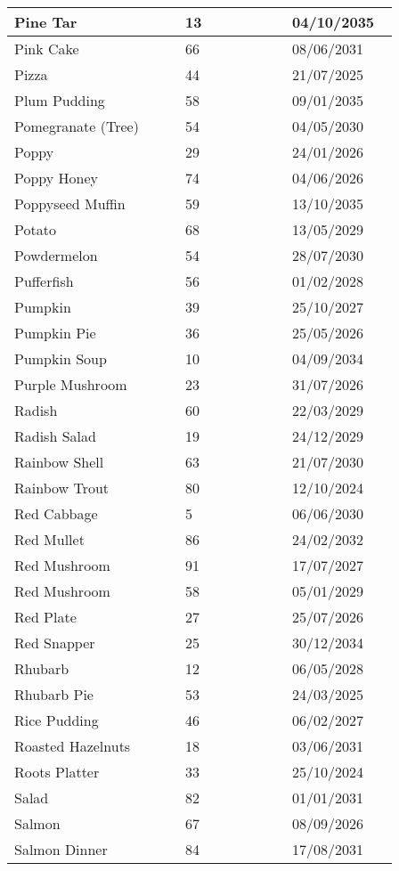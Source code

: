 \documentclass{article}
\begin{document}
\begin{longtable}{|p{0.4\linewidth}|p{0.25\linewidth}|p{0.25\linewidth}|}
\hline
Pine Tar & 13 & 04/10/2035 \\
\hline
Pink Cake & 66 & 08/06/2031 \\
\hline
Pizza & 44 & 21/07/2025 \\
\hline
Plum Pudding & 58 & 09/01/2035 \\
\hline
Pomegranate (Tree) & 54 & 04/05/2030 \\
\hline
Poppy & 29 & 24/01/2026 \\
\hline
Poppy Honey & 74 & 04/06/2026 \\
\hline
Poppyseed Muffin & 59 & 13/10/2035 \\
\hline
Potato & 68 & 13/05/2029 \\
\hline
Powdermelon & 54 & 28/07/2030 \\
\hline
Pufferfish & 56 & 01/02/2028 \\
\hline
Pumpkin & 39 & 25/10/2027 \\
\hline
Pumpkin Pie & 36 & 25/05/2026 \\
\hline
Pumpkin Soup & 10 & 04/09/2034 \\
\hline
Purple Mushroom & 23 & 31/07/2026 \\
\hline
Radish & 60 & 22/03/2029 \\
\hline
Radish Salad & 19 & 24/12/2029 \\
\hline
Rainbow Shell & 63 & 21/07/2030 \\
\hline
Rainbow Trout & 80 & 12/10/2024 \\
\hline
Red Cabbage & 5 & 06/06/2030 \\
\hline
Red Mullet & 86 & 24/02/2032 \\
\hline
Red Mushroom & 91 & 17/07/2027 \\
\hline
Red Mushroom & 58 & 05/01/2029 \\
\hline
Red Plate & 27 & 25/07/2026 \\
\hline
Red Snapper & 25 & 30/12/2034 \\
\hline
Rhubarb & 12 & 06/05/2028 \\
\hline
Rhubarb Pie & 53 & 24/03/2025 \\
\hline
Rice Pudding & 46 & 06/02/2027 \\
\hline
Roasted Hazelnuts & 18 & 03/06/2031 \\
\hline
Roots Platter & 33 & 25/10/2024 \\
\hline
Salad & 82 & 01/01/2031 \\
\hline
Salmon & 67 & 08/09/2026 \\
\hline
Salmon Dinner & 84 & 17/08/2031 \\

\end{longtable}
\end{document}
